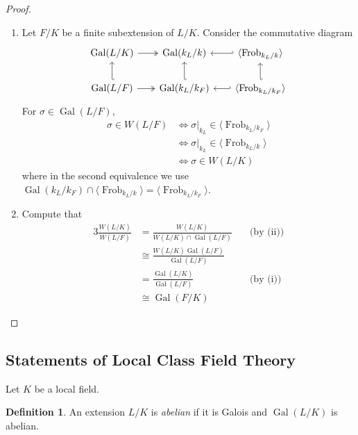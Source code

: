 \documentclass[11pt]{article}
\theoremstyle{definition}
\newtheorem{definition}{Definition}[subsection]
\theoremstyle{plain}
\theoremstyle{remark}
\DeclareMathOperator{\Gal}{Gal}
\DeclareMathOperator{\Frob}{Frob}
\begin{document}
\begin{proof}
\begin{enumerate}
        \item Let $F/K$ be a finite subextension of $L/K$. Consider the commutative diagram
            \begin{equation*}
                \begin{tikzcd}[column sep=scriptsize]
                \Gal(L/K) \arrow[r, twoheadrightarrow] \arrow[d, hookleftarrow] & \Gal(k_L/k) \arrow[r, hookleftarrow] \arrow[d, hookleftarrow] & \langle \Frob_{k_L/k} \arrow[d, hookleftarrow] \rangle\\
                \Gal(L/F) \arrow[r, twoheadrightarrow] & \Gal(k_L/k_F) \arrow[r, hookleftarrow] & \langle \Frob_{k_L/k_F} \rangle
            \end{tikzcd}
            \end{equation*}
            For $\sigma \in \Gal(L/F)$,
            \begin{align*}
                \sigma \in W(L/F)
                &\iff \sigma \vert_{k_L} \in \langle \Frob_{k_L/k_F} \rangle\\
                &\iff \sigma \vert_{k_L} \in \langle \Frob_{k_L/k} \rangle\\
                &\iff \sigma \in W(L/K)
            \end{align*}
            where in the second equivalence we use $\Gal(k_L/k_F) \cap \langle \Frob_{k_L/k} \rangle = \langle \Frob_{k_L/k_F} \rangle$.
        \item Compute that
            \begin{alignat*}{3}
                \frac{W(L/K)}{W(L/F)}
                &= \frac{W(L/K)}{W(L/K) \cap \Gal(L/F)} &\quad\text{(by (ii))}\\
                &\cong \frac{W(L/K) \Gal(L/F)}{\Gal(L/F)}\\
                &= \frac{\Gal(L/K)}{\Gal(L/F)} &\quad\text{(by (i))}\\
                &\cong \Gal(F/K)
            \end{alignat*}
            \qedhere
    \end{enumerate}
\end{proof}

\subsection{Statements of Local Class Field Theory}

Let $K$ be a local field.

\begin{definition}\label{def:17_1}
    An extension $L/K$ is \emph{abelian} if it is Galois and $\Gal(L/K)$ is abelian.
\end{definition}
\end{document}
